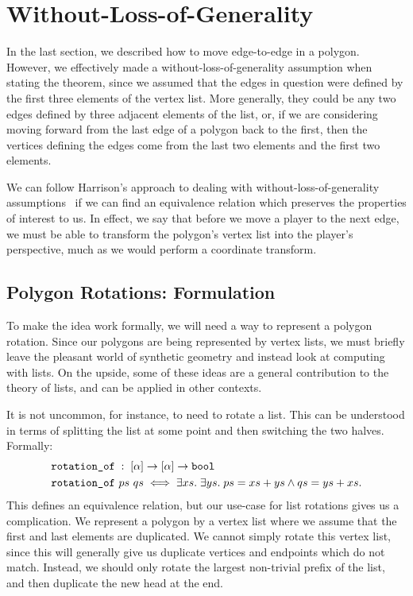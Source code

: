\section{Without-Loss-of-Generality}
In the last section, we described how to move edge-to-edge in a polygon. However, we effectively made a without-loss-of-generality assumption when stating the theorem, since we assumed that the edges in question were defined by the first three elements of the vertex list. More generally, they could be any two edges defined by  three adjacent elements of the list, or, if we are considering moving forward from the last edge of a polygon back to the first, then the vertices defining the edges come from the last two elements and the first two elements.

We can follow Harrison's approach to dealing with without-loss-of-generality assumptions~\cite{HarrisonWLOG} if we can find an equivalence relation which preserves the properties of interest to us. In effect, we say that before we move a player to the next edge, we must be able to transform the polygon's vertex list into the player's perspective, much as we would perform a coordinate transform.

\subsection{Polygon Rotations: Formulation}\label{sec:PolygonRotation}
To make the idea work formally, we will need a way to represent a polygon rotation. Since our polygons are being represented by vertex lists, we must briefly leave the pleasant world of synthetic geometry and instead look at computing with lists. On the upside, some of these ideas are a general contribution to the theory of lists, and can be applied in other contexts. 

It is not uncommon, for instance, to need to rotate a list. This can be understood in terms of splitting the list at some point and then switching the two halves. Formally:
\begin{displaymath}
  \begin{split}
&\texttt{rotation\_of}\; :\; [\alpha] \rightarrow [\alpha] \rightarrow \texttt{bool}\\
&\texttt{rotation\_of}\ ps\ qs \iff \exists xs.\;\exists ys.\; ps = xs + ys \wedge qs = ys + xs.\\
  \end{split}
\end{displaymath}
This defines an equivalence relation, but our use-case for list rotations gives us a complication. We represent a polygon by a vertex list where we assume that the first and last elements are duplicated. We cannot simply rotate this vertex list, since this will generally give us duplicate vertices and endpoints which do not match. Instead, we should only rotate the largest non-trivial prefix of the list, and then duplicate the new head at the end. 

